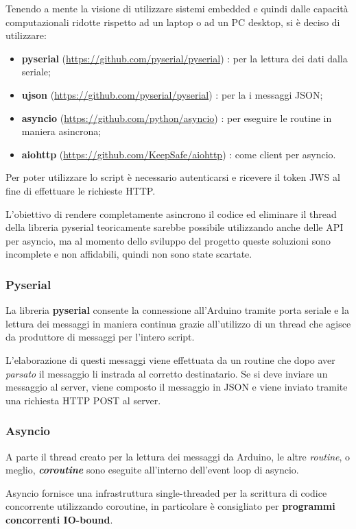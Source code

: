 Tenendo a mente la visione di utilizzare sistemi embedded e quindi dalle capacità computazionali ridotte rispetto ad un laptop o ad un PC desktop, si è deciso di utilizzare:
\begin{itemize}
	\item \textbf{pyserial} (\url{https://github.com/pyserial/pyserial}) : per la lettura dei dati dalla seriale;
	\item \textbf{ujson} (\url{https://github.com/pyserial/pyserial}) : per la i messaggi JSON;
	\item \textbf{asyncio} (\url{https://github.com/python/asyncio}) : per eseguire le routine in maniera asincrona;
	\item \textbf{aiohttp} (\url{https://github.com/KeepSafe/aiohttp}) : come client per asyncio.
\end{itemize}

Per poter utilizzare lo script è necessario autenticarsi e ricevere il token JWS al fine di effettuare le richieste HTTP.

L'obiettivo di rendere completamente asincrono il codice ed eliminare il thread della libreria pyserial teoricamente sarebbe possibile utilizzando anche delle API per asyncio, ma al momento dello sviluppo del progetto queste soluzioni sono incomplete e non affidabili, quindi non sono state scartate.

\subsubsection{Pyserial}
La libreria \textbf{pyserial} consente la connessione all'Arduino tramite porta seriale e la lettura dei messaggi in maniera continua grazie all'utilizzo di un thread che agisce da produttore di messaggi per l'intero script.

L'elaborazione di questi messaggi viene effettuata da un routine che dopo aver \textit{parsato} il messaggio li instrada al corretto destinatario. Se si deve inviare un messaggio al server, viene composto il messaggio in JSON e viene inviato tramite una richiesta HTTP POST al server.

\subsubsection{Asyncio}
A parte il thread creato per la lettura dei messaggi da Arduino, le altre \textit{routine}, o meglio, \textit{\textbf{coroutine}} sono eseguite all'interno dell'event loop di asyncio. 

Asyncio fornisce una infrastruttura single-threaded per la scrittura di codice concorrente utilizzando coroutine, in particolare è consigliato per \textbf{programmi concorrenti IO-bound}. 


